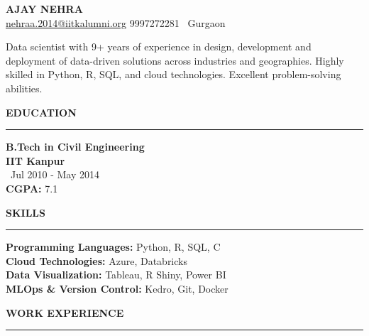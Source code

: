 \documentclass[a4paper,10pt]{article}
\begin{document}
\begin{center}
    \textbf{\LARGE \MakeUppercase{Ajay Nehra}} \\
    \vspace{1mm}
    \href{mailto:nehraa.2014@iitkalumni.org}{nehraa.2014@iitkalumni.org} \hspace{5mm} 9997272281 \hspace{5mm} \faMapMarker \,  Gurgaon
\end{center}

\vspace{1mm} %

Data scientist with 9+ years of experience in design, development and deployment of data-driven solutions across industries and geographies. Highly skilled in Python, R, SQL, and cloud technologies. Excellent problem-solving abilities.

\vspace{1mm}

\begin{multicols}{2}

\textbf{\LARGE \MakeUppercase{Education}} \\
\vspace{0mm}
\rule{\columnwidth}{0.8pt} %
\textbf{B.Tech in Civil Engineering} \\
\textbf{IIT Kanpur} \\
\faCalendar \, Jul 2010 - May 2014 \\
\textbf{CGPA:} 7.1

\columnbreak

\textbf{\LARGE \MakeUppercase{Skills}} \\
\vspace{0mm}
\rule{\columnwidth}{0.8pt} %
\textbf{Programming Languages:} Python, R, SQL, C \\
\textbf{Cloud Technologies:} Azure, Databricks \\
\textbf{Data Visualization:} Tableau, R Shiny, Power BI \\
\textbf{MLOps \& Version Control:} Kedro, Git, Docker

\end{multicols}

\vspace{1mm} %

\textbf{\LARGE \MakeUppercase{Work Experience}} \\
\vspace{1mm}
\rule{\textwidth}{0.8pt} %
\end{document}
